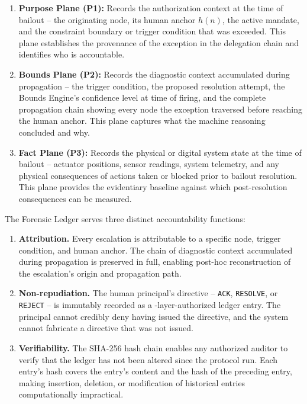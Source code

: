 \begin{enumerate}\itemsep=0pt
\item \textbf{Purpose Plane (P1):} Records the authorization context at the time of
bailout -- the originating node, its human anchor $h(n)$, the active mandate, and
the constraint boundary or trigger condition that was exceeded. This plane establishes
the provenance of the exception in the delegation chain and identifies who is
accountable.

\item \textbf{Bounds Plane (P2):} Records the diagnostic context accumulated during
propagation -- the trigger condition, the proposed resolution attempt, the Bounds
Engine's confidence level at time of firing, and the complete propagation chain
showing every node the exception traversed before reaching the human anchor. This
plane captures what the machine reasoning concluded and why.

\item \textbf{Fact Plane (P3):} Records the physical or digital system state at the
time of bailout -- actuator positions, sensor readings, system telemetry, and any
physical consequences of actions taken or blocked prior to bailout resolution. This
plane provides the evidentiary baseline against which post-resolution consequences
can be measured.
\end{enumerate}

The Forensic Ledger serves three distinct accountability functions:

\begin{enumerate}\itemsep=0pt
\item \textbf{Attribution.} Every escalation is attributable to a specific node,
trigger condition, and human anchor. The chain of diagnostic context accumulated
during propagation is preserved in full, enabling post-hoc reconstruction of the
escalation's origin and propagation path.

\item \textbf{Non-repudiation.} The human principal's directive -- \texttt{ACK},
\texttt{RESOLVE}, or \texttt{REJECT} -- is immutably recorded as a
\purpose-layer-authorized ledger entry. The principal cannot credibly deny having
issued the directive, and the system cannot fabricate a directive that was not
issued.

\item \textbf{Verifiability.} The SHA-256 hash chain enables any authorized auditor
to verify that the ledger has not been altered since the protocol run. Each entry's
hash covers the entry's content and the hash of the preceding entry, making
insertion, deletion, or modification of historical entries computationally
impractical.
\end{enumerate}

